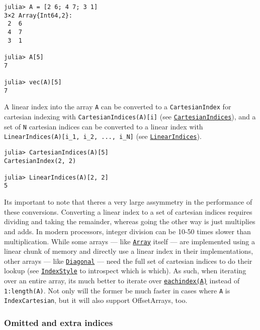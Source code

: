 \begin{verbatim}
julia> A = [2 6; 4 7; 3 1]
3×2 Array{Int64,2}:
 2  6
 4  7
 3  1

julia> A[5]
7

julia> vec(A)[5]
7
\end{verbatim}



A linear index into the array \texttt{A} can be converted to a \texttt{CartesianIndex} for cartesian indexing with \texttt{CartesianIndices(A)[i]} (see \hyperlink{16831958174907250244}{\texttt{CartesianIndices}}), and a set of \texttt{N} cartesian indices can be converted to a linear index with \texttt{LinearIndices(A)[i\_1, i\_2, ..., i\_N]} (see \hyperlink{12250457823889413092}{\texttt{LinearIndices}}).




\begin{verbatim}
julia> CartesianIndices(A)[5]
CartesianIndex(2, 2)

julia> LinearIndices(A)[2, 2]
5
\end{verbatim}



It{\textquotesingle}s important to note that there{\textquotesingle}s a very large assymmetry in the performance of these conversions. Converting a linear index to a set of cartesian indices requires dividing and taking the remainder, whereas going the other way is just multiplies and adds. In modern processors, integer division can be 10-50 times slower than multiplication. While some arrays — like \hyperlink{15492651498431872487}{\texttt{Array}} itself — are implemented using a linear chunk of memory and directly use a linear index in their implementations, other arrays — like \hyperlink{3300114559258360989}{\texttt{Diagonal}} — need the full set of cartesian indices to do their lookup (see \hyperlink{7782790551324367092}{\texttt{IndexStyle}} to introspect which is which). As such, when iterating over an entire array, it{\textquotesingle}s much better to iterate over \hyperlink{4701773772897287974}{\texttt{eachindex(A)}} instead of \texttt{1:length(A)}. Not only will the former be much faster in cases where \texttt{A} is \texttt{IndexCartesian}, but it will also support OffsetArrays, too.



\hypertarget{3274469472431833212}{}


\subsubsection{Omitted and extra indices}



